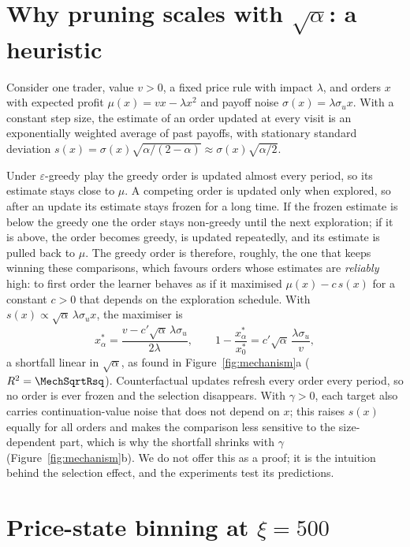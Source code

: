 \section{Why pruning scales with $\sqrt{\alpha}$: a heuristic}
\label{app:sqrt}

Consider one trader, value $v>0$, a fixed price rule with impact $\lambda$,
and orders $x$ with expected profit $\mu(x)=vx-\lambda x^2$ and payoff noise
$\sigma(x)=\lambda\sigma_u x$. With a constant step size, the estimate of an
order updated at every visit is an exponentially weighted average of past
payoffs, with stationary standard deviation
$s(x)=\sigma(x)\sqrt{\alpha/(2-\alpha)}\approx\sigma(x)\sqrt{\alpha/2}$.

Under $\varepsilon$-greedy play the greedy order is updated almost every
period, so its estimate stays close to $\mu$. A competing order is updated
only when explored, so after an update its estimate stays frozen for a long
time. If the frozen estimate is below the greedy one the order stays
non-greedy until the next exploration; if it is above, the order becomes
greedy, is updated repeatedly, and its estimate is pulled back to $\mu$. The
greedy order is therefore, roughly, the one that keeps winning these
comparisons, which favours orders whose estimates are \emph{reliably} high:
to first order the learner behaves as if it maximised
$\mu(x)-c\,s(x)$ for a constant $c>0$ that depends on the exploration
schedule. With $s(x)\propto\sqrt\alpha\,\lambda\sigma_u x$, the maximiser is
\[
x^\ast_\alpha=\frac{v-c'\sqrt\alpha\,\lambda\sigma_u}{2\lambda},
\qquad
1-\frac{x^\ast_\alpha}{x^\ast_0}=c'\sqrt\alpha\,\frac{\lambda\sigma_u}{v},
\]
a shortfall linear in $\sqrt\alpha$, as found in
Figure~\ref{fig:mechanism}a ($R^2=\MechSqrtRsq$). Counterfactual updates
refresh every order every period, so no order is ever frozen and the
selection disappears. With $\gamma>0$, each target also carries
continuation-value noise that does not depend on $x$; this raises $s(x)$
equally for all orders and makes the comparison less sensitive to the
size-dependent part, which is why the shortfall shrinks with $\gamma$
(Figure~\ref{fig:mechanism}b). We do not offer this as a proof; it is the
intuition behind the selection effect, and the experiments test its
predictions.

\section{Price-state binning at $\xi=500$}
\label{app:binning}


